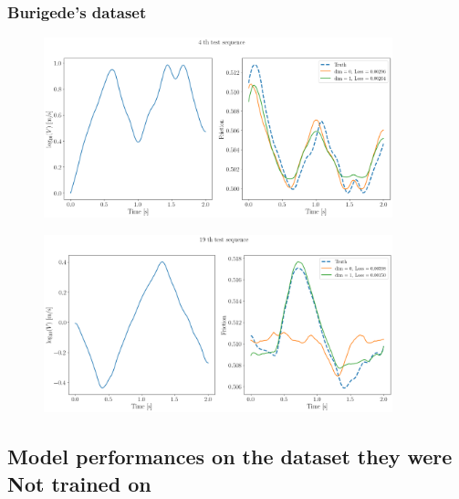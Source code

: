 \subsubsection{Burigede's dataset}
\begin{figure}[H]
    \centering
    \includegraphics[width=0.9\textwidth]{images/dtTSqBurigede1204_1.png}
    \label{fig:dtTSqBurigede1204_1}
\end{figure}

\begin{figure}[H]
    \centering
    \includegraphics[width=0.9\textwidth]{images/dtTSqBurigede1204_2.png}
    \label{fig:dtTSqburigede1204_2}
\end{figure}

\subsection{Model performances on the dataset they were Not trained on}
